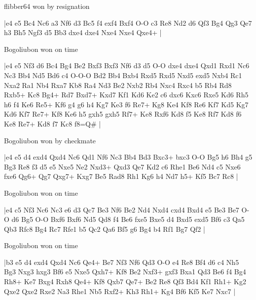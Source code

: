 \showboard

flibber64 won by resignation

\makegametitle
|e4 e5 Bc4 Nc6 a3 Nf6 d3 Bc5 f4 exf4 Bxf4 O-O c3 Re8 Nd2 d6 Qf3 Bg4 Qg3 Qe7 h3 Bh5 Ngf3 d5 Bb3 dxe4 dxe4 Nxe4 Nxe4 Qxe4+  |

\showboard

Bogoliubon won on time

\makegametitle
|e4 e5 Nf3 d6 Bc4 Bg4 Be2 Bxf3 Bxf3 Nf6 d3 d5 O-O dxe4 dxe4 Qxd1 Rxd1 Nc6 Nc3 Bb4 Nd5 Bd6 c4 O-O-O Bd2 Bb4 Bxb4 Rxd5 Rxd5 Nxd5 exd5 Nxb4 Rc1 Nxa2 Ra1 Nb4 Rxa7 Kb8 Ra4 Nd3 Be2 Nxb2 Rb4 Nxc4 Rxc4 b5 Rb4 Rd8 Rxb5+ Kc8 Bg4+ Rd7 Bxd7+ Kxd7 Kf1 Kd6 Ke2 c6 dxc6 Kxc6 Rxe5 Kd6 Rh5 h6 f4 Ke6 Re5+ Kf6 g4 g6 h4 Kg7 Ke3 f6 Re7+ Kg8 Ke4 Kf8 Re6 Kf7 Kd5 Kg7 Kd6 Kf7 Re7+ Kf8 Ke6 h5 gxh5 gxh5 Rf7+ Ke8 Rxf6 Kd8 f5 Ke8 Rf7 Kd8 f6 Ke8 Re7+ Kd8 f7 Kc8 f8=Q\#  |

\showboard

Bogoliubon won by checkmate

\makegametitle
|e4 e5 d4 exd4 Qxd4 Nc6 Qd1 Nf6 Nc3 Bb4 Bd3 Bxc3+ bxc3 O-O Bg5 h6 Bh4 g5 Bg3 Re8 f3 d5 e5 Nxe5 Ne2 Nxd3+ Qxd3 Qe7 Kd2 c6 Rhe1 Be6 Nd4 c5 Nxe6 fxe6 Qg6+ Qg7 Qxg7+ Kxg7 Be5 Rad8 Rh1 Kg6 h4 Nd7 h5+ Kf5 Bc7 Rc8  |

\showboard

Bogoliubon won on time

\makegametitle
|e4 c5 Nf3 Nc6 Nc3 e6 d3 Qc7 Be3 Nf6 Be2 Nd4 Nxd4 cxd4 Bxd4 e5 Be3 Be7 O-O d6 Bg5 O-O Bxf6 Bxf6 Nd5 Qd8 f4 Be6 fxe5 Bxe5 d4 Bxd5 exd5 Bf6 c3 Qa5 Qb3 Rfc8 Bg4 Rc7 Rfe1 b5 Qc2 Qa6 Bf5 g6 Bg4 b4 Rf1 Bg7 Qf2  |

\showboard

Bogoliubon won on time

\makegametitle
|b3 e5 d4 exd4 Qxd4 Nc6 Qe4+ Be7 Nf3 Nf6 Qd3 O-O e4 Re8 Bf4 d6 c4 Nh5 Bg3 Nxg3 hxg3 Bf6 e5 Nxe5 Qxh7+ Kf8 Be2 Nxf3+ gxf3 Bxa1 Qd3 Be6 f4 Bg4 Rh8+ Ke7 Bxg4 Rxh8 Qe4+ Kf8 Qxb7 Qe7+ Be2 Re8 Qf3 Bd4 Kf1 Rh1+ Kg2 Qxe2 Qxe2 Rxe2 Na3 Rhe1 Nb5 Rxf2+ Kh3 Rh1+ Kg4 Bf6 Kf5 Ke7 Nxc7  |

\showboard

